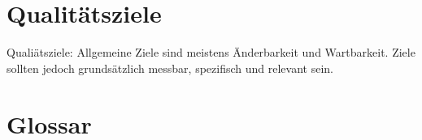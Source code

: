 \documentclass[a4paper]{scrreprt}
\begin{document}
        \newpage

    \chapter{Qualitätsziele}
        Qualiätsziele: Allgemeine Ziele sind meistens Änderbarkeit und Wartbarkeit.
        Ziele sollten jedoch grundsätzlich messbar, spezifisch und relevant sein.

    \chapter{Glossar}

    \listoffigures
\end{document}

